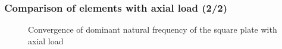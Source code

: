 \documentclass[9pt]{beamer}
\begin{document}
\begin{frame}\frametitle{Comparison of elements with axial load (2/2)}
\begin{figure}


\caption{Convergence of dominant natural frequency of the square plate with axial load}
\end{figure}
\end{frame}

\end{document}
